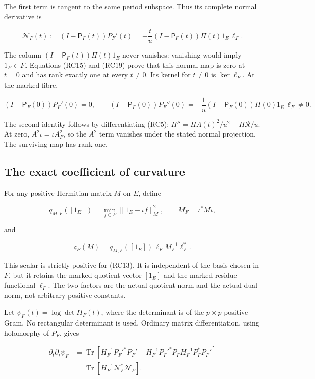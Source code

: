 \documentclass[
  11pt,
]{article}
\begin{document}
The first term is tangent to the same period subspace. Thus its complete
normal derivative is

\[
\boxed{\mathcal N_F(t):=(I-\mathsf P_F(t))P_F'(t)
=-\frac t u (I-\mathsf P_F(t))\Pi(t)1_E\,\ell_F.}
\tag{RC19}
\]

The column \((I-\mathsf P_F(t))\Pi(t)1_E\) never vanishes: vanishing
would imply \(1_E\in F\). Equations (RC15) and (RC19) prove that this
normal map is zero at \(t=0\) and has rank exactly one at every
\(t\ne0\). Its kernel for \(t\ne0\) is \(\ker\ell_F\). At the marked
fibre,

\[
\boxed{(I-\mathsf P_F(0))P_F'(0)=0,
\qquad (I-\mathsf P_F(0))P_F''(0)
=-\frac1u(I-\mathsf P_F(0))\Pi(0)1_E\,\ell_F\ne0.}
\tag{RC20}
\]

The second identity follows by differentiating (RC5):
\(\Pi''=\Pi A(t)^2/u^2-\Pi\mathcal R/u\). At zero,
\(A^2\iota=\iota A_F^2\), so the \(A^2\) term vanishes under the stated
normal projection. The surviving map has rank one.

\subsection{The exact coefficient of
curvature}\label{the-exact-coefficient-of-curvature}

For any positive Hermitian matrix \(M\) on \(E\), define

\[
q_{M,F}([1_E])=\min_{f\in F}\|1_E-\iota f\|_M^2,
\qquad M_F=\iota^*M\iota,
\tag{RC21}
\]

and

\[
\boxed{\mathfrak c_F(M)
=q_{M,F}([1_E])\,\ell_F M_F^{-1}\ell_F^*.}
\tag{RC22}
\]

This scalar is strictly positive for (RC13). It is independent of the
basis chosen in \(F\), but it retains the marked quotient vector
\([1_E]\) and the marked residue functional \(\ell_F\). The two factors
are the actual quotient norm and the actual dual norm, not arbitrary
positive constants.

Let \(\psi_F(t)=\log\det H_F(t)\), where the determinant is of the
\(p\times p\) positive Gram. No rectangular determinant is used.
Ordinary matrix differentiation, using holomorphy of \(P_F\), gives

\[
\begin{split}
\partial_t\partial_{\bar t}\psi_F
&=\operatorname{Tr}\left[
H_F^{-1}P_F'^*P_F'
-H_F^{-1}P_F'^*P_FH_F^{-1}P_F^*P_F'
\right]\\
&=\operatorname{Tr}\left[H_F^{-1}\mathcal N_F^*\mathcal N_F\right].
\end{split}
\tag{RC23}
\]
\end{document}
